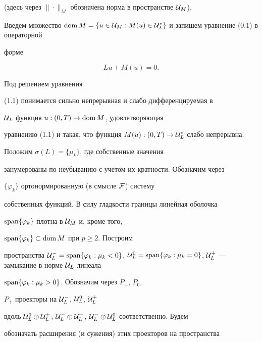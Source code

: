 (здесь через $\|\cdot\|_M$ обозначена норма в пространстве ${\cal U}_M$).





Введем множество $\doms M = \{u\in{\cal U}_M :


M(u)\in{\cal U}^*_L\}$ и запишем уравнение (0.1) в операторной


форме


\begin{equation}


L \Dot u + M(u) = 0.


\end{equation}


Под решением уравнения


(1.1) понимается сильно непрерывная и слабо дифференцируемая в


${\cal U}_L$ функция $u : (0, T)\to\operatorname{dom} M$, удовлетворяющая


уравнению (1.1) и такая, что функция $M(u) : (0, T)\to {\cal


U}_L^*$ слабо непрерывна.





Положим $\sigma(L) = \{\mu_k\}$, где собственные значения


занумерованы по неубыванию с учетом их кратности. Обозначим через


$\{\varphi_k\}$ ортонормированную (в смысле ${\cal F}$) систему


собственных функций. В силу гладкости границы линейная оболочка


$\operatorname{span}\{\varphi_k\}$ плотна в ${\cal U}_M$ и, кроме того,


$\operatorname{span}\{\varphi_k\}\subset\operatorname{dom} M$ при $p\ge 2$. Построим


пространства ${\cal U}_L^- = \spanz\{\varphi_k : \mu_k


< 0\}$, ${\cal U}_L^0 = \spanz\{\varphi_k : \mu_k = 0\}$, ${\cal


U}^+_L$ --- замыкание в норме ${\cal U}_L$ линеала


$\operatorname{span}\{\varphi_k : \mu_k > 0\}$. Обозначим через $P_-$, $P_0$,


$P_+$ проекторы на ${\cal U}_L^-$, ${\cal U}_L^0$, ${\cal U}_L^+$


вдоль ${\cal U}_L^0\oplus{\cal U}_L^+$, ${\cal U}_L^-\oplus{\cal


U}_L^+$, ${\cal U}_L^-\oplus{\cal U}_L^0$ соответственно. Будем


обозначать расширения (и сужения) этих проекторов на пространства


